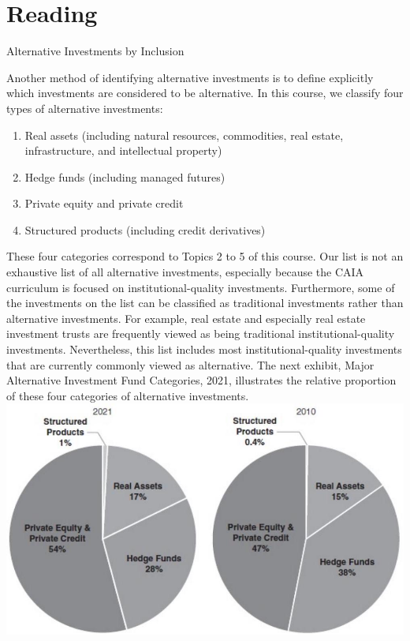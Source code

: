 \documentclass[11pt]{article}
\begin{document}
\section*{Reading}
Alternative Investments by Inclusion

Another method of identifying alternative investments is to define explicitly which investments are considered to be alternative. In this course, we classify four types of alternative investments:

\begin{enumerate}
  \item Real assets (including natural resources, commodities, real estate, infrastructure, and intellectual property)

  \item Hedge funds (including managed futures)

  \item Private equity and private credit

  \item Structured products (including credit derivatives)

\end{enumerate}

These four categories correspond to Topics 2 to 5 of this course. Our list is not an exhaustive list of all alternative investments, especially because the CAIA curriculum is focused on institutional-quality investments. Furthermore, some of the investments on the list can be classified as traditional investments rather than alternative investments. For example, real estate and especially real estate investment trusts are frequently viewed as being traditional institutional-quality investments. Nevertheless, this list includes most institutional-quality investments that are currently commonly viewed as alternative. The next exhibit, Major Alternative Investment Fund Categories, 2021, illustrates the relative proportion of these four categories of alternative investments.\\
\includegraphics[max width=\textwidth, center]{2024_04_10_d2fcf76e99549155a577g-2}
\end{document}
